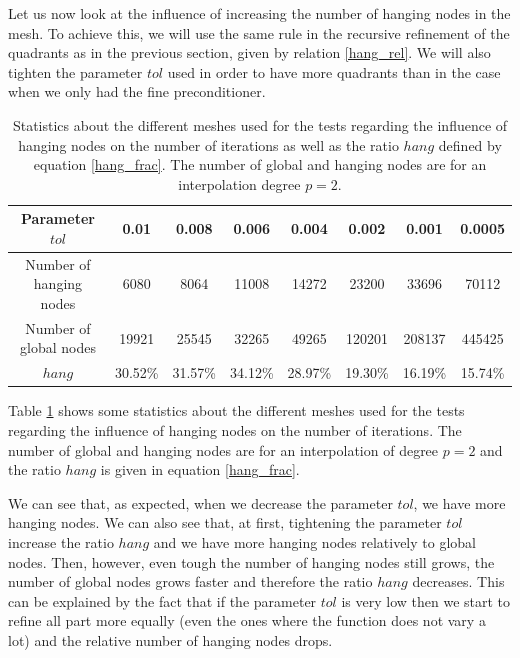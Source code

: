 Let us now look at the influence of increasing the number of hanging nodes in the mesh. To achieve this, we will use the same rule in the recursive refinement of the quadrants as in the previous section, given by relation \ref{hang_rel}. We will also tighten the parameter $tol$ used in order to have more quadrants than in the case when we only had the fine preconditioner. 

\begin{table}
\centering
\begin{tabular}{c|ccccccc}
Parameter $tol$ & 0.01 & 0.008 & 0.006 & 0.004 & 0.002 & 0.001 & 0.0005\\
\hline
Number of hanging nodes & 6080 & 8064 & 11008 & 14272 & 23200 & 33696 & 70112\\
Number of global nodes & 19921 & 25545 & 32265 & 49265 & 120201 & 208137 & 445425\\
$hang$ & 30.52\% & 31.57\% & 34.12\% & 28.97\% & 19.30\% & 16.19\% & 15.74\%
\end{tabular}
\caption{Statistics about the different meshes used for the tests regarding the influence of hanging nodes on the number of iterations as well as the ratio $hang$ defined by equation \ref{hang_frac}. The number of global and hanging nodes are for an interpolation degree $p=2$.}
\label{two_hang_table}
\end{table}

Table \ref{two_hang_table} shows some statistics about the different meshes used for the tests regarding the influence of hanging nodes on the number of iterations. The number of global and hanging nodes are for an interpolation of degree $p=2$ and the ratio $hang$ is given in equation \ref{hang_frac}.

We can see that, as expected, when we decrease the parameter $tol$, we have more hanging nodes. We can also see that, at first, tightening the parameter $tol$ increase the ratio $hang$ and we have more hanging nodes relatively to global nodes. Then, however, even tough the number of hanging nodes still grows, the number of global nodes grows faster and therefore the ratio $hang$ decreases. This can be explained by the fact that if the parameter $tol$ is very low then we start to refine all part more equally (even the ones where the function does not vary a lot) and the relative number of hanging nodes drops. 

